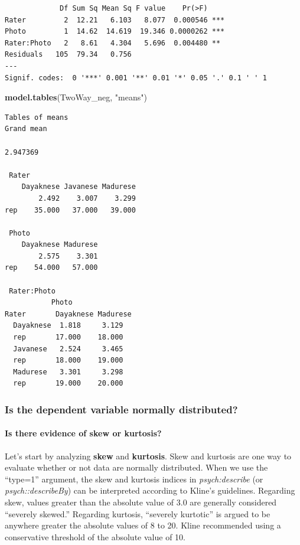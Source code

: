\documentclass[
  11pt,
]{book}
\newenvironment{Shaded}{\begin{snugshade}}{\end{snugshade}}
\newcommand{\FunctionTok}[1]{\textcolor[rgb]{0.27,0.27,0.27}{\textbf{#1}}}
\newcommand{\NormalTok}[1]{#1}
\newcommand{\StringTok}[1]{\textcolor[rgb]{0.5,0.5,0.5}{#1}}
\begin{document}
\begin{verbatim}
             Df Sum Sq Mean Sq F value    Pr(>F)    
Rater         2  12.21   6.103   8.077  0.000546 ***
Photo         1  14.62  14.619  19.346 0.0000262 ***
Rater:Photo   2   8.61   4.304   5.696  0.004480 ** 
Residuals   105  79.34   0.756                      
---
Signif. codes:  0 '***' 0.001 '**' 0.01 '*' 0.05 '.' 0.1 ' ' 1
\end{verbatim}

\begin{Shaded}
\begin{Highlighting}[]
\FunctionTok{model.tables}\NormalTok{(TwoWay\_neg, }\StringTok{"means"}\NormalTok{)}
\end{Highlighting}
\end{Shaded}

\begin{verbatim}
Tables of means
Grand mean
         
2.947369 

 Rater 
    Dayaknese Javanese Madurese
        2.492    3.007    3.299
rep    35.000   37.000   39.000

 Photo 
    Dayaknese Madurese
        2.575    3.301
rep    54.000   57.000

 Rater:Photo 
           Photo
Rater       Dayaknese Madurese
  Dayaknese  1.818     3.129  
  rep       17.000    18.000  
  Javanese   2.524     3.465  
  rep       18.000    19.000  
  Madurese   3.301     3.298  
  rep       19.000    20.000  
\end{verbatim}

\hypertarget{is-the-dependent-variable-normally-distributed}{%
\subsubsection{Is the dependent variable normally distributed?}\label{is-the-dependent-variable-normally-distributed}}

\hypertarget{is-there-evidence-of-skew-or-kurtosis}{%
\paragraph{Is there evidence of skew or kurtosis?}\label{is-there-evidence-of-skew-or-kurtosis}}

Let's start by analyzing \textbf{skew} and \textbf{kurtosis}. Skew and kurtosis are one way to evaluate whether or not data are normally distributed. When we use the ``type=1'' argument, the skew and kurtosis indices in \emph{psych:describe} (or \emph{psych::describeBy}) can be interpreted according to Kline's \citeyearpar{kline_data_2016} guidelines. Regarding skew, values greater than the absolute value of 3.0 are generally considered ``severely skewed.'' Regarding kurtosis, ``severely kurtotic'' is argued to be anywhere greater the absolute values of 8 to 20. Kline recommended using a conservative threshold of the absolute value of 10.
\end{document}
